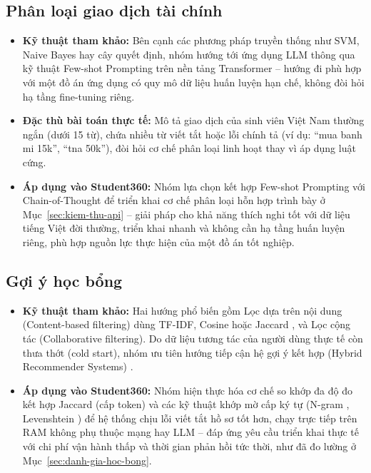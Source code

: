 \subsection{Phân loại giao dịch tài chính}
\begin{itemize}
    \item \textbf{Kỹ thuật tham khảo:} Bên cạnh các phương pháp truyền thống như SVM, Naive Bayes hay cây quyết định, nhóm hướng tới ứng dụng LLM thông qua kỹ thuật Few-shot Prompting \cite{brown2020-gpt3} trên nền tảng Transformer \cite{vaswani2017attention, devlin2018bert} -- hướng đi phù hợp với một đồ án ứng dụng có quy mô dữ liệu huấn luyện hạn chế, không đòi hỏi hạ tầng fine-tuning riêng.
    \item \textbf{Đặc thù bài toán thực tế:} Mô tả giao dịch của sinh viên Việt Nam thường ngắn (dưới 15 từ), chứa nhiều từ viết tắt hoặc lỗi chính tả (ví dụ: ``mua banh mi 15k'', ``tna 50k''), đòi hỏi cơ chế phân loại linh hoạt thay vì áp dụng luật cứng.
    \item \textbf{Áp dụng vào Student360:} Nhóm lựa chọn kết hợp Few-shot Prompting với Chain-of-Thought \cite{wei2022-cot} để triển khai cơ chế phân loại hỗn hợp trình bày ở Mục~\ref{sec:kiem-thu-api} -- giải pháp cho khả năng thích nghi tốt với dữ liệu tiếng Việt đời thường, triển khai nhanh và không cần hạ tầng huấn luyện riêng, phù hợp nguồn lực thực hiện của một đồ án tốt nghiệp.
\end{itemize}

\subsection{Gợi ý học bổng}
\begin{itemize}
    \item \textbf{Kỹ thuật tham khảo:} Hai hướng phổ biến gồm Lọc dựa trên nội dung (Content-based filtering) dùng TF-IDF, Cosine hoặc Jaccard \cite{jaccard1901}, và Lọc cộng tác (Collaborative filtering). Do dữ liệu tương tác của người dùng thực tế còn thưa thớt (cold start), nhóm ưu tiên hướng tiếp cận hệ gợi ý kết hợp (Hybrid Recommender Systems) \cite{burke2002hybrid, adomavicius2005toward}.
    \item \textbf{Áp dụng vào Student360:} Nhóm hiện thực hóa cơ chế so khớp đa độ đo kết hợp Jaccard (cấp token) và các kỹ thuật khớp mờ cấp ký tự (N-gram \cite{cavnar1994-ngram}, Levenshtein \cite{levenstein1966}) để hệ thống chịu lỗi viết tắt hồ sơ tốt hơn, chạy trực tiếp trên RAM không phụ thuộc mạng hay LLM -- đáp ứng yêu cầu triển khai thực tế với chi phí vận hành thấp và thời gian phản hồi tức thời, như đã đo lường ở Mục~\ref{sec:danh-gia-hoc-bong}.
\end{itemize}

